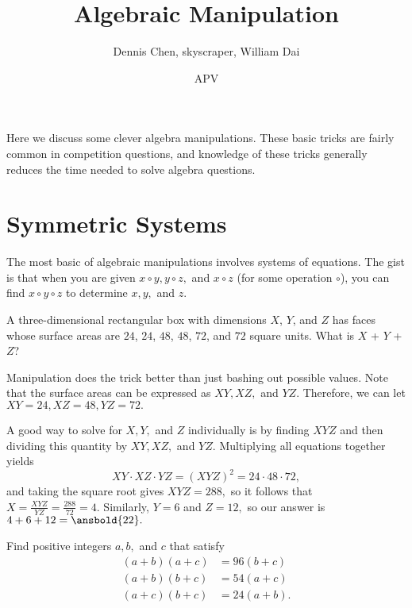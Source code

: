\documentclass[mast]{lucky}
\title{Algebraic Manipulation}
\author{Dennis Chen, skyscraper, William Dai}
\date{APV}
\begin{document}
\maketitle

Here we discuss some clever algebra manipulations. These basic tricks are fairly common in competition questions, and knowledge of these tricks generally reduces the time needed to solve algebra questions.

\section{Symmetric Systems}

The most basic of algebraic manipulations involves systems of equations. The gist is that when you are given $x\circ y,y\circ z,$ and $x\circ z$ (for some operation $\circ$), you can find $x \circ y \circ z$ to determine $x,y,$ and $z.$
\begin{exam}[2018 AMC 10B/4]
A three-dimensional rectangular box with dimensions $X$, $Y$, and $Z$ has faces whose surface areas are $24$, $24$, $48$, $48$, $72$, and $72$ square units. What is $X$ + $Y$ + $Z$?
\end{exam}
\begin{sol}
Manipulation does the trick better than just bashing out possible values. Note that the surface areas can be expressed as $XY,XZ,$ and $YZ.$ Therefore, we can let $XY = 24, XZ = 48, YZ = 72.$

A good way to solve for $X,Y,$ and $Z$ individually is by finding $XYZ$ and then dividing this quantity by $XY, XZ,$ and $YZ.$ Multiplying all equations together yields
\[XY \cdot XZ \cdot YZ = (XYZ)^2 = 24 \cdot 48 \cdot 72,\]
and taking the square root gives $XYZ = 288,$ so it follows that $X = \frac{XYZ}{YZ} = \frac{288}{72} = 4.$ Similarly, $Y = 6$ and $Z=12,$ so our answer is $4+6+12=\ansbold{22}.$
\end{sol}
\begin{exam}[Classic]
Find positive integers $a,b,$ and $c$ that satisfy
\begin{align*}
(a+b)(a+c)&=96(b+c) \\
(a+b)(b+c)&=54(a+c) \\
(a+c)(b+c)&=24(a+b).
\end{align*}
\end{exam}
\end{document}
